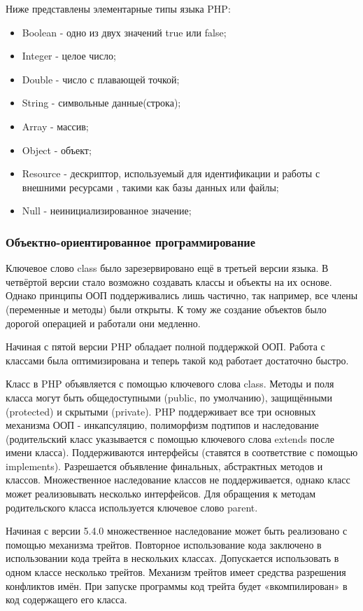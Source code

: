 Ниже представлены элементарные типы языка PHP:
\begin{itemize}
  \item Boolean - одно из двух значений true или false;
  \item Integer - целое число;
  \item Double - число с плавающей точкой;
  \item String - символьные данные(строка);
  \item Array - массив;
  \item Object - объект;
  \item Resource - дескриптор, используемый для идентификации и работы с внешними ресурсами , такими как базы данных или файлы; 
  \item Null - неинициализированное значение;
\end{itemize}


\subsubsection{Объектно-ориентированное программирование }
\label{sub:practice:oop_php}
Ключевое слово class было зарезервировано ещё в третьей версии языка. В четвёртой версии стало возможно создавать классы и объекты на их основе. Однако принципы ООП поддерживались лишь частично, так например, все члены (переменные и методы) были открыты. К тому же создание объектов было дорогой операцией и работали они медленно.

Начиная с пятой версии PHP обладает полной поддержкой ООП. Работа с классами была оптимизирована и теперь такой код работает достаточно быстро.

Класс в PHP объявляется с помощью ключевого слова class. Методы и поля класса могут быть общедоступными (public, по умолчанию), защищёнными (protected) и скрытыми (private). PHP поддерживает все три основных механизма ООП - инкапсуляцию, полиморфизм подтипов и наследование (родительский класс указывается с помощью ключевого слова extends после имени класса). Поддерживаются интерфейсы (ставятся в соответствие с помощью implements). Разрешается объявление финальных, абстрактных методов и классов. Множественное наследование классов не поддерживается, однако класс может реализовывать несколько интерфейсов. Для обращения к методам родительского класса используется ключевое слово parent.

Начиная с версии 5.4.0 множественное наследование может быть реализовано с помощью механизма трейтов. Повторное использование кода заключено в использовании кода трейта в нескольких классах. Допускается использовать в одном классе несколько трейтов. Механизм трейтов имеет средства разрешения конфликтов имён. При запуске программы код трейта будет «вкомпилирован» в код содержащего его класса.

